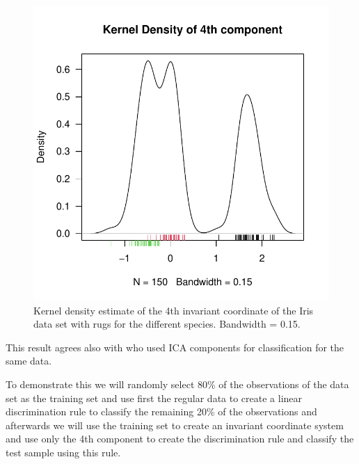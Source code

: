 \documentclass[article,nojss]{jss}
\begin{document}
\begin{figure}[t]
\begin{center}
\includegraphics{ICS-021}
\caption{Kernel density estimate of the 4th invariant coordinate of the Iris data set with rugs for the different species. Bandwidth = 0.15.}
\label{Iris_Kernel}
\end{center}
\end{figure}


This result agrees also with \citet{Bugrien2005} who used ICA components for classification for the same data.

To demonstrate this we will randomly select 80\% of the observations of the data set as the training set and use
first the regular data to create a linear discrimination rule to classify the remaining 20\% of the observations and
afterwards we will use the training set to create an invariant coordinate system and use only
the 4th component to create the discrimination rule and classify the test sample using this rule.
\end{document}

